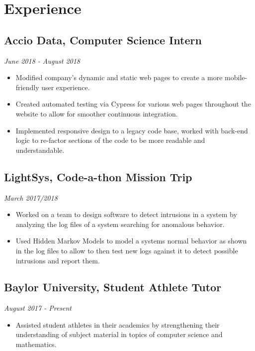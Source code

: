 \documentclass{article}
\begin{document}
\section{Experience}

\subsection{Accio Data, Computer Science Intern}
\hfill\textit{June 2018 - August 2018}

\begin{itemize}
	\itemsep0em
	\item Modified company's dynamic and static web pages to create a more
	mobile-friendly user experience.
	
	\item Created automated testing via Cypress for various web pages
	throughout the website to allow for smoother continuous integration.
	
	\item Implemented responsive design to a legacy code base, worked with
	back-end logic to re-factor sections of the code to be more
	readable and understandable.  
\end{itemize}

\subsection{LightSys, Code-a-thon Mission Trip}
\hfill
\textit{March 2017/2018}

\begin{itemize}
	\itemsep0em
	\item Worked on a team to design software to detect intrusions in a system by analyzing the log files of a system searching for anomalous behavior.
	
	\item Used Hidden Markov Models to model a systems normal behavior as shown in the log files to allow  to then test new logs against it to detect possible intrusions and report them.
\end{itemize}

\subsection{Baylor University, Student Athlete Tutor} 
\hfill\textit{August 2017 - Present}

\begin{itemize}
	\itemsep0em
	\item Assisted student athletes in their academics by strengthening their understanding of subject material in topics of computer science and mathematics.
\end{itemize}
  
\end{document}

